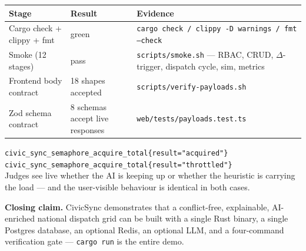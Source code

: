 \documentclass[10pt,letterpaper]{article}
\begin{document}
\begin{center}
\renewcommand{\arraystretch}{1.2}
\footnotesize
\begin{tabularx}{\textwidth}{@{}lXl@{}}
\toprule
\textbf{Stage} & \textbf{Result} & \textbf{Evidence}\\
\midrule
Cargo check + clippy + fmt & green & \texttt{cargo check / clippy -D warnings / fmt --check}\\
Smoke (12 stages) & pass & \texttt{scripts/smoke.sh} --- RBAC, CRUD, $\Delta$-trigger, dispatch cycle, sim, metrics\\
Frontend body contract & 18 shapes accepted & \texttt{scripts/verify-payloads.sh}\\
Zod schema contract & 8 schemas accept live responses & \texttt{web/tests/payloads.test.ts}\\
\bottomrule
\end{tabularx}
\end{center}

\begin{tcolorbox}[colback=csbg, colframe=csblue, boxrule=0.5pt, arc=3pt,
    left=8pt, right=8pt, top=4pt, bottom=4pt, title=\textbf{Observable AI degradation},
    fonttitle=\bfseries\small]
\footnotesize
\texttt{civic\_sync\_semaphore\_acquire\_total\{result="acquired"\}} \\
\texttt{civic\_sync\_semaphore\_acquire\_total\{result="throttled"\}} \\[2pt]
Judges see live whether the AI is keeping up or whether the heuristic is carrying the load --- and the user-visible behaviour is identical in both cases.
\end{tcolorbox}

\vspace{0.4em}
\noindent\textbf{Closing claim.} CivicSync demonstrates that a conflict-free, explainable, AI-enriched national dispatch grid can be built with a single Rust binary, a single Postgres database, an optional Redis, an optional LLM, and a four-command verification gate --- \texttt{cargo run} is the entire demo.
\end{document}
